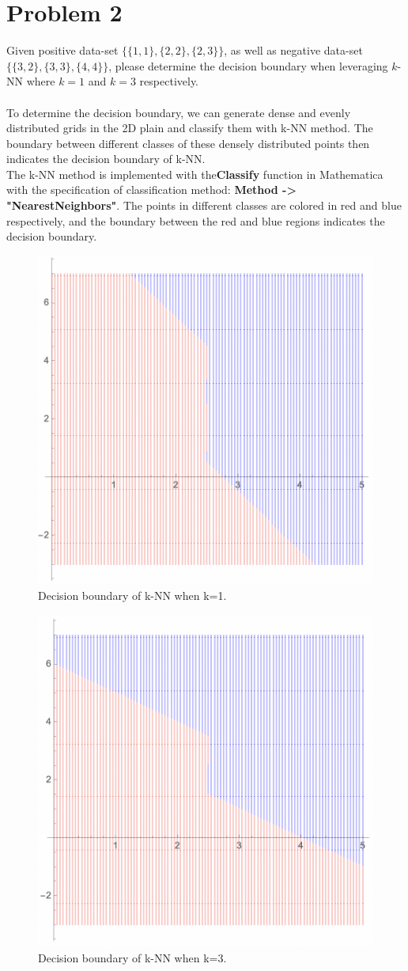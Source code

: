 \documentclass[11pt]{article}
\begin{document}
\section*{Problem 2}
Given positive data-set $\{\{1,1\},\{2,2\},\{2,3\}\}$, as well as negative data-set $\{\{3,2\},\{3,3\},\{4,4\}\}$, please determine the decision boundary when leveraging $k$-NN where $k=1$ and $k=3$ respectively.\\ \\
To determine the decision boundary, we can generate dense and evenly distributed grids in the 2D plain and classify them with k-NN method. The boundary between different classes of these densely distributed points then indicates the decision boundary of k-NN.\\
The k-NN method is implemented with the\textbf{Classify} function in Mathematica with the specification of classification method: \textbf{Method -> "NearestNeighbors"}. The points in different classes are colored in red and blue respectively, and the boundary between the red and blue regions indicates the decision boundary.\\
\begin{figure}[H] %
	\centering\includegraphics[width=0.4\linewidth]{prob2_k=1.png}
	\caption{Decision boundary of k-NN when k=1.} %
	\label{fig:fig5}  %
\end{figure}
\begin{figure}[H] %
	\centering\includegraphics[width=0.4\linewidth]{prob2_k=3.png}
	\caption{Decision boundary of k-NN when k=3.} %
	\label{fig:fig6}  %
\end{figure}
\end{document}
